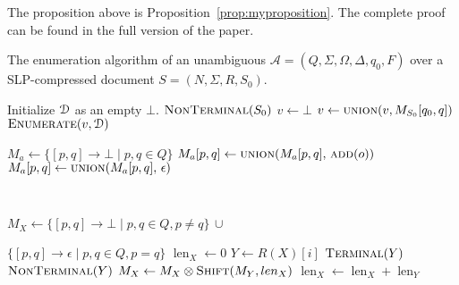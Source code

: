 The proposition above is Proposition~\ref{prop:myproposition}. The complete proof can be found in the full version of the paper.


\let\oldReturn\Return
\renewcommand{\Return}{\State\oldReturn}

\begin{algorithm*}[t]
	\caption{The enumeration algorithm of an unambiguous $\mathcal{A} = (Q,\Sigma, \Omega, \Delta,q_0,F)$ over a SLP-compressed document $S = (N, \Sigma, R, S_0)$.}\label{alg:evaluation}
	\smallskip
	\begin{varwidth}[t]{0.60\textwidth}
		\begin{algorithmic}[1]
			\State Initialize $\mathcal{D}$ as an empty $\bot$.
			\State $\textproc{NonTerminal}(S_0)$
			\State $v \gets \bot$
			\State $v \gets \textsc{union}(v, M_{S_0}[q_0, q])$
			\EndFor
			\State $\textproc{Enumerate}(v, \cD)$
			
			\EndProcedure
			\smallskip
			
			\State $M_a \gets \{[p,q] \to \bot \mid p,q \in  Q\}$
			\State $M_a[p,q] \gets \textsc{union}(M_a[p,q],\, \textsc{add}(o))$
			\EndFor
			\State $M_a[p,q] \gets \textsc{union}(M_a[p,q], \, \epsilon)$
			\EndFor
			\EndProcedure
		\end{algorithmic}
	\end{varwidth} \ \ \ \ \ 
	\begin{varwidth}[t]{0.60\textwidth}
		\begin{algorithmic}[1]
			\State $M_X \gets \{[p,q] \to \bot \mid p,q \in  Q, p \neq q\} \, \cup$ \par\hspace{2.7em} $\{[p,q] \to \epsilon \mid p,q \in  Q, p = q\}$
			\State $\operatorname{len}_X \gets 0$
			\State $Y \gets R(X)[i]$
			\State $\textproc{Terminal}(Y)$
			\Else
			\State $\textproc{NonTerminal}(Y)$
			\EndIf 
			\EndIf 
			\State $M_X \gets M_X \otimes \textproc{Shift}(M_Y, \operatorname{len}_X)$
			\State $\operatorname{len}_X \gets \operatorname{len}_X + \operatorname{len}_Y$
			\EndFor 
			\EndProcedure
		\end{algorithmic}
	\end{varwidth} 
	\smallskip
\end{algorithm*}


